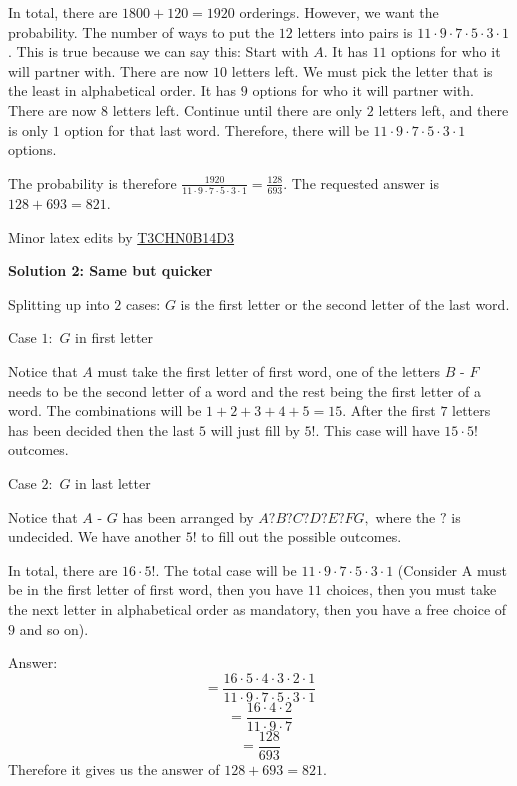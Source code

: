 \begin{enumerate}
 In total, there are $1800+120 = 1920$ orderings. However, we want the probability. The number of ways to put the $12$ letters into pairs is $11 \cdot 9 \cdot 7 \cdot 5 \cdot 3 \cdot 1$. This is true because we can say this: Start with $A$. It has $11$ options for who it will partner with. There are now $10$ letters left. We must pick the letter that is the least in alphabetical order. It has $9$ options for who it will partner with. There are now $8$ letters left. Continue until there are only $2$ letters left, and there is only $1$ option for that last word. Therefore, there will be  $11 \cdot 9 \cdot 7 \cdot 5 \cdot 3 \cdot 1$ options.

 The probability is therefore $\frac{1920}{11 \cdot 9 \cdot 7 \cdot 5 \cdot 3 \cdot 1} = \frac{128}{693}$. The requested answer is $128 + 693 = \boxed{821}$.

 Minor latex edits by \href{https://artofproblemsolving.com/wiki/index.php?title=User:T3chn0b14d3&action=edit&redlink=1}{T3CHN0B14D3}

 



\textbf{Solution 2: Same but quicker}

Splitting up into $2$ cases: $G$ is the first letter or the second letter of the last word.

 Case $1:$ $G$ in first letter

 Notice that $A$ must take the first letter of first word, one of the letters $B$ - $F$ needs to be the second letter of a word and the rest being the first letter of a word. The combinations will be $1 + 2 + 3 + 4 + 5 = 15.$ After the first $7$ letters has been decided then the last $5$ will just fill by $5!.$ This case will have $15 \cdot 5!$ outcomes.

 
Case $2:$ $G$ in last letter

 Notice that $A$ - $G$ has been arranged by $A? B? C? D? E? FG,$ where the $?$ is undecided. We have another $5!$ to fill out the possible outcomes. 

 In total, there are $16 \cdot 5!.$ The total case will be $11 \cdot 9 \cdot 7 \cdot 5 \cdot 3 \cdot 1$ (Consider A must be in the first letter of first word, then you have $11$ choices, then you must take the next letter in alphabetical order as mandatory, then you have a free choice of $9$ and so on). 

 Answer:
 \[= \frac{16 \cdot 5 \cdot 4 \cdot 3 \cdot 2 \cdot 1}{ 11 \cdot 9 \cdot 7 \cdot 5 \cdot 3 \cdot 1}\]
 \[= \frac{16 \cdot 4 \cdot 2}{11 \cdot 9 \cdot 7}\]
 \[= \frac{128}{ 693}\]Therefore it gives us the answer of ${128 + 693 = \boxed{821}.}$


\end{enumerate}
